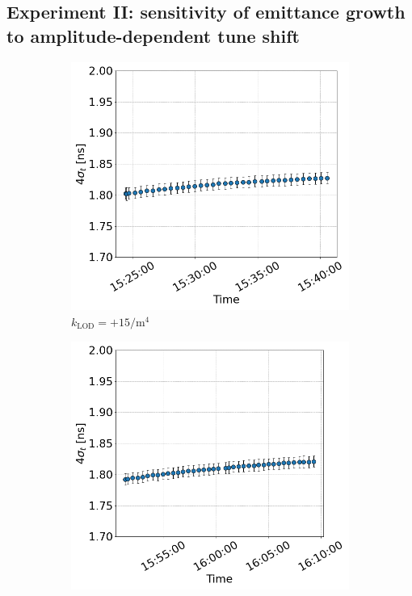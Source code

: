  \subsection{Experiment II: sensitivity of emittance growth to amplitude-dependent tune shift}\label{subsec:2022_exp2_bunch_length}

  \begin{figure}[htp]
     \centering
     \begin{subfigure}{.45\textwidth}
         \centering
         \includegraphics[width=.95\linewidth]{images/app_c/bunch_length_COAST_06.png}  
         \caption{$k_\mathrm{LOD}=+15 \mathrm{/m^{4}}$}
     \end{subfigure}
     \begin{subfigure}{.45\textwidth}
         \centering
         \includegraphics[width=.95\linewidth]{images/app_c/bunch_length_COAST_07.png}  

\end{subfigure}
\end{figure}
